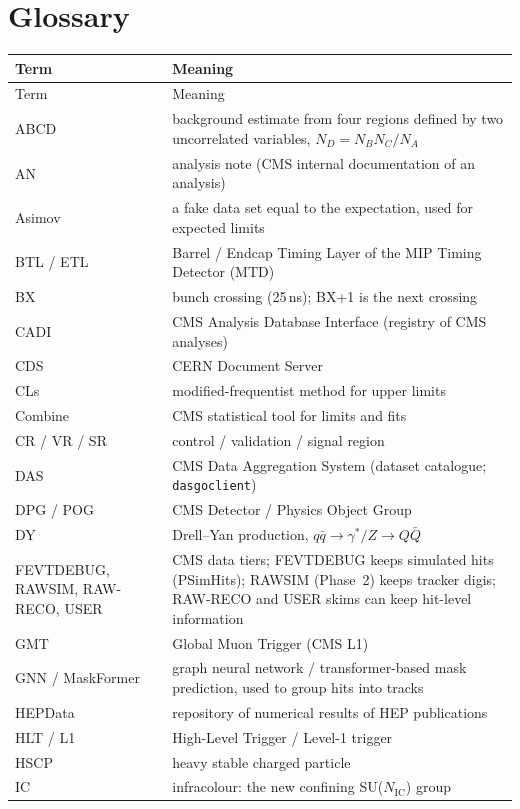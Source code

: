 \documentclass[11pt,a4paper]{article}
\newcommand{\NIC}{N_{\mathrm{IC}}}
\begin{document}
\section{Glossary}\label{app:gloss}
{\footnotesize
\begin{longtable}{@{}L{3.19cm}L{13.48cm}@{}}
\toprule Term & Meaning\\\midrule\endfirsthead
\toprule Term & Meaning\\\midrule\endhead
\bottomrule\endfoot
ABCD & background estimate from four regions defined by two uncorrelated variables, $N_D=N_BN_C/N_A$\\
AN & analysis note (CMS internal documentation of an analysis)\\
Asimov & a fake data set equal to the expectation, used for expected limits\\
BTL / ETL & Barrel / Endcap Timing Layer of the MIP Timing Detector (MTD)\\
BX & bunch crossing (25\,ns); BX+1 is the next crossing\\
CADI & CMS Analysis Database Interface (registry of CMS analyses)\\
CDS & CERN Document Server\\
CLs & modified-frequentist method for upper limits\\
Combine & CMS statistical tool for limits and fits\\
CR / VR / SR & control / validation / signal region\\
DAS & CMS Data Aggregation System (dataset catalogue; \texttt{dasgoclient})\\
DPG / POG & CMS Detector / Physics Object Group\\
DY & Drell--Yan production, $q\bar q\to\gamma^*/Z\to Q\bar Q$\\
FEVTDEBUG, RAWSIM, RAW-RECO, USER & CMS data tiers; FEVTDEBUG keeps simulated hits (PSimHits); RAWSIM (Phase~2) keeps tracker digis; RAW-RECO and USER skims can keep hit-level information\\
GMT & Global Muon Trigger (CMS L1)\\
GNN / MaskFormer & graph neural network / transformer-based mask prediction, used to group hits into tracks\\
HEPData & repository of numerical results of HEP publications\\
HLT / L1 & High-Level Trigger / Level-1 trigger\\
HSCP & heavy stable charged particle\\
IC & infracolour: the new confining SU($\NIC$) group\\

\end{longtable}}
\end{document}
